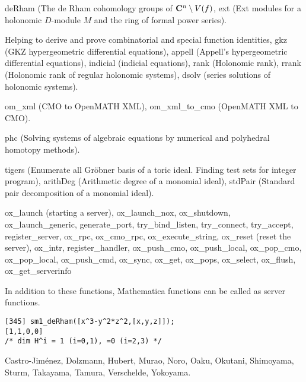 \noindent
{deRham} (The de Rham cohomology groups of
${\bf C}^n \setminus V(f)$,
{ext} (Ext modules for a holonomic $D$-module $M$
and the ring of formal power series).

\medbreak
\noindent
{}

\noindent
Helping to derive and prove {combinatorial} and
{special function identities},
{gkz} (GKZ hypergeometric differential equations),
{appell} (Appell's hypergeometric differential equations),
{indicial} (indicial equations),
{rank} (Holonomic rank),
{rrank} (Holonomic rank of regular holonomic systems),
{dsolv} (series solutions of holonomic systems).

\medbreak
\noindent
{}

\noindent
{om\_xml} (CMO to OpenMATH XML),
{om\_xml\_to\_cmo} (OpenMATH XML to CMO).

\medbreak
\noindent
{}

\noindent
{phc} (Solving systems of algebraic equations by
numerical and polyhedral homotopy methods).

\medbreak
\noindent
{}

\noindent
{tigers} (Enumerate all Gr\"obner basis of a toric ideal.
Finding test sets for integer program),
{arithDeg} (Arithmetic degree of a monomial ideal),
{stdPair} (Standard pair decomposition of a monomial ideal).

\medbreak
\noindent
{}

\noindent
{ox\_launch} (starting a server),
{ox\_launch\_nox},
{ox\_shutdown},
{ox\_launch\_generic},
{generate\_port},
{try\_bind\_listen},
{try\_connect},
{try\_accept},
{register\_server},
{ox\_rpc},
{ox\_cmo\_rpc},
{ox\_execute\_string},
{ox\_reset} (reset the server),
{ox\_intr},
{register\_handler},
{ox\_push\_cmo},
{ox\_push\_local},
{ox\_pop\_cmo},
{ox\_pop\_local},
{ox\_push\_cmd},
{ox\_sync},
{ox\_get},
{ox\_pops},
{ox\_select},
{ox\_flush},
{ox\_get\_serverinfo}

\medbreak
\noindent
In addition to these functions, {Mathematica functions}
can be called as server functions.

\medbreak
\noindent
{}
{\footnotesize
\begin{verbatim}
[345] sm1_deRham([x^3-y^2*z^2,[x,y,z]]);
[1,1,0,0]
/* dim H^i = 1 (i=0,1), =0 (i=2,3) */
\end{verbatim}}



\medbreak
\noindent
{}
Castro-Jim\'enez, Dolzmann, Hubert, Murao, Noro, Oaku, Okutani,
Shimoyama, Sturm, Takayama, Tamura, Verschelde, Yokoyama.
